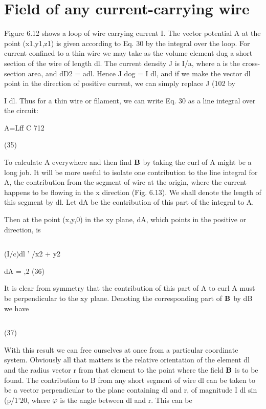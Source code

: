 \section{Field of any current-carrying wire}

Figure 6.12 shows a loop of wire carrying current I. The vector
potential A at the point (x1,y1,z1) is given according to Eq. 30 by the
integral over the loop. For current confined to a thin wire we may
take as the volume element dug a short section of the wire of length dl.
The current density J is I/a, where a is the cross-section area, and
dD2 = adl. Hence J dog = I dl, and if we make the vector dl point
in the direction of positive current, we can simply replace J (102 by

I dl. Thus for a thin wire or filament, we can write Eq. 30 as a line
integral over the circuit:

\begin{equation}
\end{equation}
A=Lff
C 712

(35)

To calculate A everywhere and then find $\mathbf{B}$ by taking the curl of A
might be a long job. It will be more useful to isolate one contribution
to the line integral for A, the contribution from the segment of
wire at the origin, where the current happens to be flowing in the
x direction (Fig. 6.13). We shall denote the length of this segment
by dl. Let dA be the contribution of this part of the integral to A.

Then at the point (x,y,0) in the xy plane, dA, which points in the
positive or direction, is

\begin{equation}
\end{equation}

(I/c)dl
' /x2 + y2

dA = ,2 (36)

It is clear from symmetry that the contribution of this part of A to
curl A must be perpendicular to the xy plane. Denoting the corresponding
part of $\mathbf{B}$ by dB we have

\begin{equation}
\end{equation}

(37)

With this result we can free ourselves at once from a particular
coordinate system. Obviously all that matters is the relative orientation
of the element dl and the radius vector r from that element to
the point where the field $\mathbf{B}$ is to be found. The contribution to B
from any short segment of wire dl can be taken to be a vector
perpendicular to the plane containing dl and r, of magnitude
I dl sin (p/1'20, where $\varphi$ is the angle between dl and r. This can be

